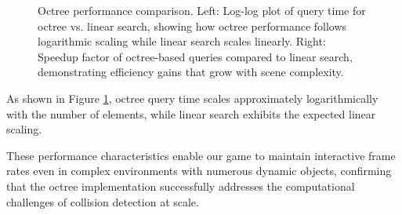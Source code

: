 \documentclass{article}
\begin{document}
\begin{figure}[H]
\begin{minipage}{0.49\textwidth}
    \end{minipage}
    \hfill
    \begin{minipage}{0.49\textwidth}
        \centering
    \end{minipage}
    \caption{Octree performance comparison. Left: Log-log plot of query time for octree vs. linear search, showing how octree performance follows logarithmic scaling while linear search scales linearly. Right: Speedup factor of octree-based queries compared to linear search, demonstrating efficiency gains that grow with scene complexity.}
    \label{fig:octree-performance}
\end{figure}

As shown in Figure \ref{fig:octree-performance}, octree query time scales
approximately logarithmically with the number of elements, while linear search
exhibits the expected linear scaling.


These performance characteristics enable our game to maintain interactive frame
rates even in complex environments with numerous dynamic objects, confirming
that the octree implementation successfully addresses the computational
challenges of collision detection at scale.
\end{document}

